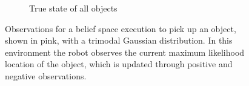 \begin{figure}
\begin{subfigure}[b]{0.3\linewidth}
    \caption{True state of all objects}
    \label{fig:step6}
  \end{subfigure}
  \caption{Observations for a belief space execution
    to pick up an object, shown in pink, with a trimodal Gaussian distribution.
    In this environment the robot observes the current maximum likelihood location
    of the object, which is updated through positive and negative observations.}
  \label{fig:experiment}
\end{figure}
